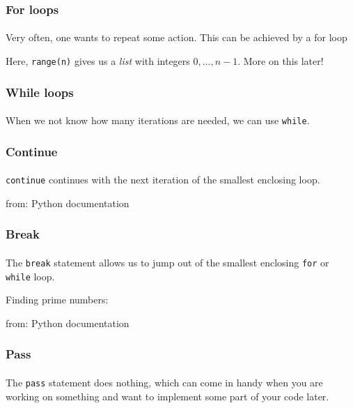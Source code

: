 \begin{frame}\frametitle{For loops}
    \framesubtitle{}

    Very often, one wants to repeat some action. This can be achieved by a for loop


    Here, \texttt{range(n)} gives us a \emph{list} with integers $0,\ldots,n-1$.
    More on this later!

\end{frame}

\begin{frame}\frametitle{While loops}
    \framesubtitle{}

    When we not know how many iterations are needed, we can use \texttt{while}.


\end{frame}

\begin{frame}\frametitle{Continue}
    \framesubtitle{}

    \texttt{continue} continues with the next iteration of the smallest enclosing loop.

    \pause

    from: Python documentation

\end{frame}

\begin{frame}\frametitle{Break}
    \framesubtitle{}

    The \texttt{break} statement allows us to jump out of the smallest enclosing
    \texttt{for} or \texttt{while} loop.
    \vfill\pause

    Finding prime numbers:

    from: Python documentation

\end{frame}

\begin{frame}\frametitle{Pass}
    \framesubtitle{}

    The \texttt{pass} statement does nothing, which can come in handy when you are
    working on something and want to implement some part of your code later.


\end{frame}


